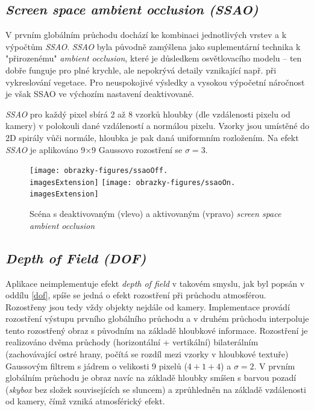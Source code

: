 \subsection{\textit{Screen space ambient occlusion (SSAO)}}
V prvním globálním průchodu dochází ke kombinaci jednotlivých vrstev a k výpočtům \textit{SSAO}. \textit{SSAO} byla původně zamýšlena jako suplementární technika k "přirozenému" \textit{ambient occlusion}, které je důsledkem osvětlovacího modelu -- ten dobře funguje pro plné krychle, ale nepokrývá detaily vznikající např. při vykreslování vegetace. Pro neuspokojivé výsledky a vysokou výpočetní náročnost je však SSAO ve výchozím nastavení deaktivované.

\textit{SSAO} pro každý pixel sbírá 2 až 8 vzorků hloubky (dle vzdálenosti pixelu od kamery) v polokouli dané vzdáleností a normálou pixelu. Vzorky jsou umístěné do 2D spirály vůči normále, hloubka je pak daná uniformním rozložením. Na efekt \textit{SSAO} je aplikováno 9×9 Gaussovo rozostření se $\sigma = 3$.

\begin{figure}[H]
	\texttt{[image: obrazky-figures/ssaoOff.\\imagesExtension]}
	\hfill
	\texttt{[image: obrazky-figures/ssaoOn.\\imagesExtension]}
	\caption{Scéna s deaktivovaným (vlevo) a aktivovaným (vpravo) \textit{screen space ambient occlusion}}
\end{figure}

\subsection{\textit{Depth of Field (DOF)}}
Aplikace neimplementuje efekt \textit{depth of field} v takovém smyslu, jak byl popsán v oddílu \ref{dof}, spíše se jedná o efekt rozostření při průchodu atmosférou. Rozostřeny jsou tedy vždy objekty nejdále od kamery. Implementace provádí rozostření výstupu prvního globálního průchodu a v druhém průchodu interpoluje tento rozostřený obraz s původním na základě hloubkové informace. Rozostření je realizováno dvěma průchody (horizontální + vertikální) bilaterálním (zachovávající ostré hrany, počítá se rozdíl mezi vzorky v hloubkové textuře) Gaussovým filtrem s jádrem o velikosti 9 pixelů ($4+1+4$) a $\sigma = 2$. V prvním globálním průchodu je obraz navíc na základě hloubky smíšen s barvou pozadí (\textit{skybox} bez složek souvisejících se sluncem) a zprůhledněn na základě vzdálenosti od kamery, čímž vzniká atmosférický efekt.

